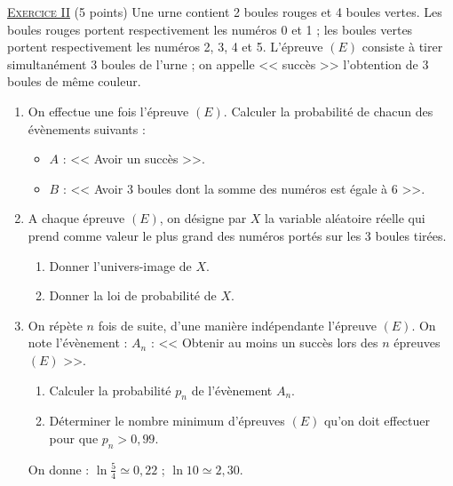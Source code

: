 \noindent \underline{\textsc{Exercice II}} (5 points) \newline
      Une urne contient 2 boules rouges et 4 boules vertes.
      Les boules rouges portent respectivement les num\'eros 0 et 1 ; 
      les boules vertes portent respectivement les num\'eros 2, 3, 4 et 5.
      L'\'epreuve $(E)$ consiste \`a tirer simultan\'ement 3 boules de l'urne ; 
      on appelle << succ\`es >> l'obtention de 3 boules de m\^eme couleur.
      \begin{enumerate}
            \item On effectue une fois l'\'epreuve $(E)$.
                  Calculer la probabilit\'e de chacun des \'ev\`enements suivants : 
                  \begin{itemize}
                        \item $A$ : << Avoir un succ\`es >>.
                        \item $B$ : << Avoir 3 boules dont la somme des num\'eros est \'egale \`a 6 >>.
                  \end{itemize}
            \item A chaque \'epreuve $(E)$, on d\'esigne par $X$ la variable al\'eatoire r\'eelle qui prend comme
                  valeur le plus grand des num\'eros port\'es sur les 3 boules tir\'ees.
                  \begin{enumerate}
                        \item Donner l'univers-image de $X$.
                        \item Donner la loi de probabilit\'e de $X$.
                  \end{enumerate}
            \item On r\'ep\`ete $n$ fois de suite, d'une mani\`ere ind\'ependante l'\'epreuve $(E)$.
                  On note l'\'ev\`enement : 
                  $A_n$ : << Obtenir au moins un succ\`es lors des $n$ \'epreuves $(E)$ >>.
                  \begin{enumerate}
                        \item Calculer la probabilit\'e $p_n$ de l'\'ev\`enement $A_n$.
                        \item D\'eterminer le nombre minimum d'\'epreuves $(E)$ qu'on doit effectuer pour que $p_n > 0,99$.
                  \end{enumerate}
                  On donne : $\ln \frac{5}{4} \simeq 0,22$ ; $\ln 10 \simeq 2,30$.
      \end{enumerate}
